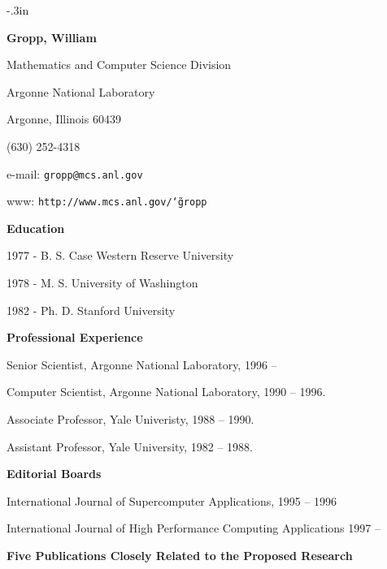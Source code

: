 
\newcommand{\itemskip}{\vspace*{12pt}}
\newcommand{\tinyskip}{\vspace*{2pt}}

\topmargin-.3in
\textwidth6.25in
\thispagestyle{empty}


\begin{flushleft}
{\bf Gropp, William}
\end{flushleft}

Mathematics and Computer Science Division

Argonne National Laboratory

Argonne, Illinois 60439

(630) 252-4318

e-mail: {\tt gropp@mcs.anl.gov}

www: {\tt http://www.mcs.anl.gov/\char`\~gropp}

\bigskip\noindent
{\bf Education}
\bigskip

1977 - B. S. Case Western Reserve University

1978 - M. S. University of Washington

1982 - Ph. D. Stanford University

\bigskip\noindent
{\bf Professional Experience}
\bigskip

Senior Scientist, Argonne National Laboratory, 1996 --

Computer Scientist, Argonne National Laboratory, 1990 -- 1996.

Associate Professor, Yale Univeristy, 1988 -- 1990.

Assistant Professor, Yale University, 1982 -- 1988.

\bigskip\noindent
{\bf Editorial Boards}
\bigskip

International Journal of Supercomputer Applications, 1995 -- 1996

International Journal of High Performance Computing Applications 1997 --


\bigskip\noindent
{\bf Five Publications Closely Related to the Proposed
 Research}

